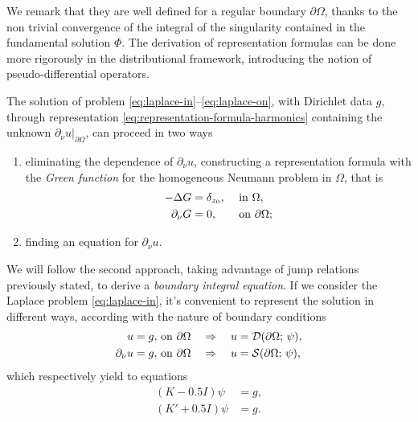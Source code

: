 \documentclass[10pt, a4paper]{article} %
\numberwithin{equation}{section}
\theoremstyle{definition}
\theoremstyle{plain}
\theoremstyle{plain}
\theoremstyle{plain}
\theoremstyle{plain}
\theoremstyle{plain}
\theoremstyle{plain}
\theoremstyle{plain}
\theoremstyle{plain}
\begin{document}
We remark that they are well defined for a regular 
boundary $\partial\Omega$, thanks to the non trivial convergence of the integral of 
the singularity contained in the fundamental solution $\Phi$.
The derivation of representation formulas can be done more rigorously in the 
distributional framework, introducing the notion of pseudo-differential operators.
\par
The solution of problem \eqref{eq:laplace-in}--\eqref{eq:laplace-on}, with Dirichlet data
$g$, through representation \eqref{eq:representation-formula-harmonics} containing 
the unknown $\partial_\nu u|_{\partial\Omega}$, can proceed in two ways
\begin{enumerate}
 \item eliminating the dependence of $\partial_\nu u$, constructing a representation
 formula with the \emph{Green function} for the homogeneous Neumann problem in $\Omega$, 
 that is
  \begin{alignat}{2}
  -\Delta G &= \delta_{z_0}, && \textup{ in }\Omega,\label{eq:green-neum-in}\\
  \partial_\nu G &= 0, && \textup{ on }\partial\Omega;\label{eq:green-neum-on}
  \end{alignat}
  \item finding an equation for $\partial_\nu u$. 
\end{enumerate}
We will follow the second approach, taking advantage of jump relations previously stated,
to derive a \emph{boundary integral equation}.
If we consider the Laplace problem \eqref{eq:laplace-in}, it's convenient to represent the 
solution in different ways, according with the nature of boundary conditions
\begin{align}
  u = g, & \textup{ on }\partial\Omega \quad \Rightarrow \quad u = \mathcal{D}(\partial\Omega;\, \psi), \label{eq:bc-lap-dir}\\
  \partial_\nu u = g, & \textup{ on }\partial\Omega \quad \Rightarrow \quad u = \mathcal{S}(\partial\Omega;\, \psi), \label{eq:bc-lap-neum}
\end{align}
which respectively yield to equations
\begin{align}
 (K - 0.5 I)\psi &= g,\label{eq:bie-dir}\\
 (K' + 0.5 I)\psi &= g.\label{eq:bie-neum}
\end{align}
\end{document}

